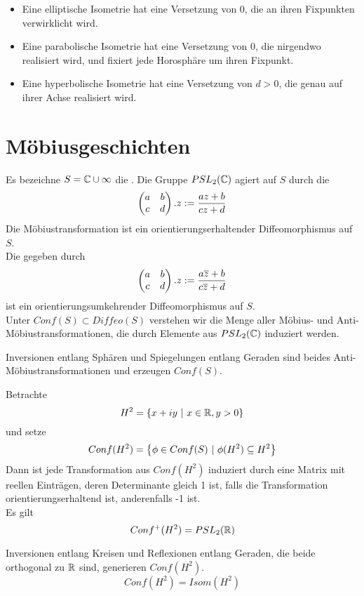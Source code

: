 \documentclass{book}
\begin{document}
\Kor{}
\begin{itemize}
	\item Eine elliptische Isometrie hat eine Versetzung von 0, die an ihren Fixpunkten verwirklicht wird.
	\item Eine parabolische Isometrie hat eine Versetzung von 0, die nirgendwo realisiert wird, und fixiert jede Horosphäre um ihren Fixpunkt.
	\item Eine hyperbolische Isometrie hat eine Versetzung von $d > 0$, die genau auf ihrer Achse realisiert wird.
\end{itemize}

\section{Möbiusgeschichten}
\Def{}
Es bezeichne $S = \mathbb{C} \cup \infty$ die . Die Gruppe $PSL_2(\mathbb{C})$ agiert auf $S$ durch die 
\[ \left(
\begin{matrix}
a & b\\
c & d
\end{matrix}
\right).z := \frac{az + b}{cz + d} \]
Die Möbiustransformation ist ein orientierungserhaltender Diffeomorphismus auf $S$.\\
Die  gegeben durch
\[ \left(
	\begin{matrix}
	a & b\\
	c & d
	\end{matrix}
\right).z := \frac{a\overline{z} + b}{c\overline{z} + d} \]
ist ein orientierungsumkehrender Diffeomorphismus auf $S$.\\
Unter $Conf(S) \subset Diffeo(S)$ verstehen wir die Menge aller Möbius- und Anti-Möbiustransformationen, die durch Elemente aus $PSL_2(\mathbb{C})$ induziert werden.

\Prop{}
Inversionen entlang Sphären und Spiegelungen entlang Geraden sind beides Anti-Möbiustransformationen und erzeugen $Conf(S)$.

\Lem{}
Betrachte
\[ H^2 = \set{ x + iy}{x \in \R, y > 0} \]
und setze
\[ Conf(H^2) = \set{\phi \in Conf(S)}{\phi(H^2) \subseteq H^2} \]
Dann ist jede Transformation aus $Conf(H^2)$ induziert durch eine Matrix mit reellen Einträgen, deren Determinante gleich 1 ist, falls die Transformation orientierungserhaltend ist, anderenfalls -1 ist.\\
Es gilt
\[ Conf^+(H^2) = PSL_2(\mathbb{R}) \]

\Prop{}
Inversionen entlang Kreisen und Reflexionen entlang Geraden, die beide orthogonal zu $\mathbb{R}$ sind, generieren $Conf(H^2)$.
\Kor{}
\[ Conf(H^2) = Isom(H^2) \]
\end{document}
